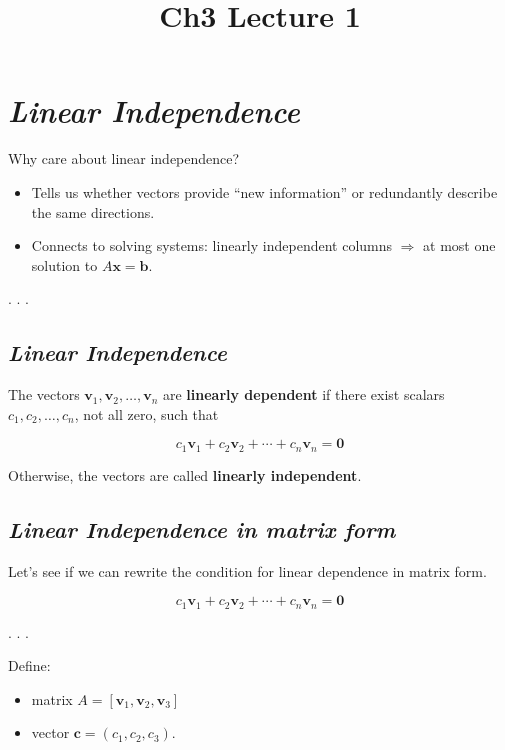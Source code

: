 \documentclass[
  letterpaper,
  DIV=11,
  numbers=noendperiod]{scrartcl}
\title{Ch3 Lecture 1}
\author{}
\date{}
\providecommand{\tightlist}{%
  \setlength{\itemsep}{0pt}\setlength{\parskip}{0pt}}\usepackage{longtable,booktabs,array}
\begin{document}
\maketitle


\section{\texorpdfstring{\emph{Linear
Independence}}{Linear Independence}}\label{linear-independence}

Why care about linear independence?

\begin{itemize}
\tightlist
\item
  Tells us whether vectors provide ``new information'' or redundantly
  describe the same directions.
\item
  Connects to solving systems: linearly independent columns
  \(\Rightarrow\) at most one solution to \(A\mathbf{x}=\mathbf{b}\).
\end{itemize}

. . .

\subsection{\texorpdfstring{\emph{Linear
Independence}}{Linear Independence}}\label{linear-independence-1}

The vectors \(\mathbf{v}_{1}, \mathbf{v}_{2}, \ldots, \mathbf{v}_{n}\)
are \textbf{linearly dependent} if there exist scalars
\(c_{1}, c_{2}, \ldots, c_{n}\), not all zero, such that

\[
c_{1} \mathbf{v}_{1}+c_{2} \mathbf{v}_{2}+\cdots+c_{n} \mathbf{v}_{n}=\mathbf{0}
\]

Otherwise, the vectors are called \textbf{linearly independent}.

\subsection{\texorpdfstring{\emph{Linear Independence in matrix
form}}{Linear Independence in matrix form}}\label{linear-independence-in-matrix-form}

Let's see if we can rewrite the condition for linear dependence in
matrix form.

\[
c_{1} \mathbf{v}_{1}+c_{2} \mathbf{v}_{2}+\cdots+c_{n} \mathbf{v}_{n}=\mathbf{0}
\]

. . .

Define:

\begin{itemize}
\tightlist
\item
  matrix
  \(A=\left[\mathbf{v}_{1}, \mathbf{v}_{2}, \mathbf{v}_{3}\right]\)
\item
  vector \(\mathbf{c}=\left(c_{1}, c_{2}, c_{3}\right)\).
\end{itemize}
\end{document}
